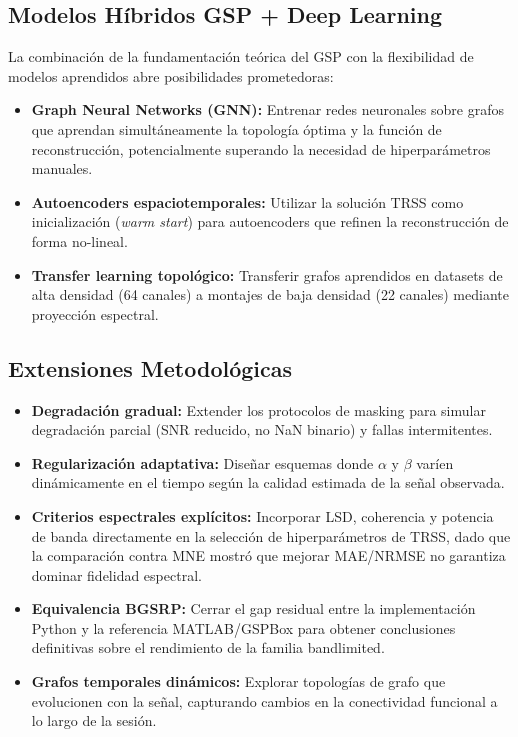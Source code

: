 \subsection{Modelos Híbridos GSP + Deep Learning}

La combinación de la fundamentación teórica del GSP con la flexibilidad de modelos aprendidos abre posibilidades prometedoras:
\begin{itemize}
    \item \textbf{Graph Neural Networks (GNN):} Entrenar redes neuronales sobre grafos que aprendan simultáneamente la topología óptima y la función de reconstrucción, potencialmente superando la necesidad de hiperparámetros manuales.
    \item \textbf{Autoencoders espaciotemporales:} Utilizar la solución TRSS como inicialización (\textit{warm start}) para autoencoders que refinen la reconstrucción de forma no-lineal.
    \item \textbf{Transfer learning topológico:} Transferir grafos aprendidos en datasets de alta densidad (64 canales) a montajes de baja densidad (22 canales) mediante proyección espectral.
\end{itemize}

\subsection{Extensiones Metodológicas}

\begin{itemize}
    \item \textbf{Degradación gradual:} Extender los protocolos de masking para simular degradación parcial (SNR reducido, no NaN binario) y fallas intermitentes.
    \item \textbf{Regularización adaptativa:} Diseñar esquemas donde $\alpha$ y $\beta$ varíen dinámicamente en el tiempo según la calidad estimada de la señal observada.
    \item \textbf{Criterios espectrales explícitos:} Incorporar LSD, coherencia y potencia de banda directamente en la selección de hiperparámetros de TRSS, dado que la comparación contra MNE mostró que mejorar MAE/NRMSE no garantiza dominar fidelidad espectral.
    \item \textbf{Equivalencia BGSRP:} Cerrar el gap residual entre la implementación Python y la referencia MATLAB/GSPBox para obtener conclusiones definitivas sobre el rendimiento de la familia bandlimited.
    \item \textbf{Grafos temporales dinámicos:} Explorar topologías de grafo que evolucionen con la señal, capturando cambios en la conectividad funcional a lo largo de la sesión.
\end{itemize}

